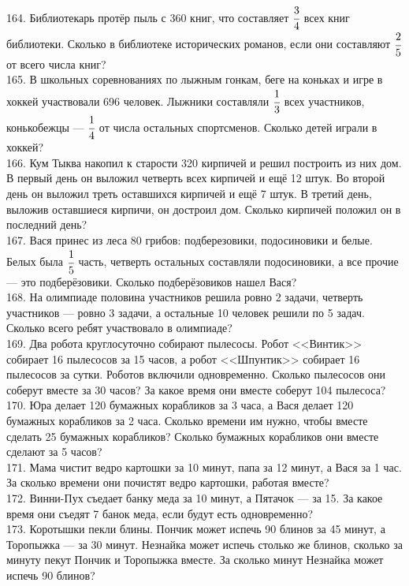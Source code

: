 \documentclass[12pt]{article}
\begin{document}
164. Библиотекарь протёр пыль с 360 книг, что составляет $\cfrac{3}{4}$ всех книг библиотеки. Сколько в библиотеке исторических романов, если они составляют $\cfrac{2}{5}$ от всего числа книг?\\
165. В школьных соревнованиях по лыжным гонкам, беге на коньках и игре в хоккей участвовали 696 человек. Лыжники составляли $\cfrac{1}{3}$ всех участников, конькобежцы --- $\cfrac{1}{4}$ от числа остальных спортсменов. Сколько детей играли в хоккей?\\
166. Кум Тыква накопил к старости 320 кирпичей и решил построить из них дом. В первый день он выложил четверть всех кирпичей и ещё 12 штук. Во второй день он выложил треть оставшихся кирпичей и ещё 7 штук. В третий день, выложив оставшиеся кирпичи, он достроил дом. Сколько кирпичей положил он в последний день?\\
167. Вася принес из леса 80 грибов: подберезовики, подосиновики и белые. Белых была $\cfrac{1}{5}$ часть, четверть остальных составляли подосиновики, а все прочие --- это подберёзовики. Сколько подберёзовиков нашел Вася?\\
168. На олимпиаде половина участников решила ровно 2 задачи, четверть участников --- ровно 3 задачи, а остальные 10 человек решили по 5 задач. Сколько всего ребят участвовало в олимпиаде?\\
169. Два робота круглосуточно собирают пылесосы. Робот <<Винтик>> собирает 16 пылесосов за 15 часов, а робот <<Шпунтик>> собирает 16 пылесосов за сутки. Роботов включили одновременно. Сколько пылесосов они соберут вместе за 30 часов? За какое время они вместе соберут 104 пылесоса?\\
170. Юра делает 120 бумажных корабликов за 3 часа, а Вася делает 120 бумажных корабликов за 2 часа. Сколько времени им нужно, чтобы вместе сделать 25 бумажных корабликов? Сколько бумажных корабликов они вместе сделают за 5 часов?\\
171. Мама чистит ведро картошки за 10 минут, папа за 12 минут, а Вася за 1 час. За сколько времени они почистят ведро картошки, работая вместе?\\
172. Винни-Пух съедает банку меда за 10 минут, а Пятачок --- за 15. За какое время они съедят 7 банок меда, если будут есть одновременно?\\
173. Коротышки пекли блины. Пончик может испечь 90 блинов за 45 минут, а Торопыжка --- за 30 минут. Незнайка может испечь столько же блинов, сколько за минуту пекут Пончик и Торопыжка вместе. За сколько минут Незнайка может испечь 90 блинов?\\
\end{document}
